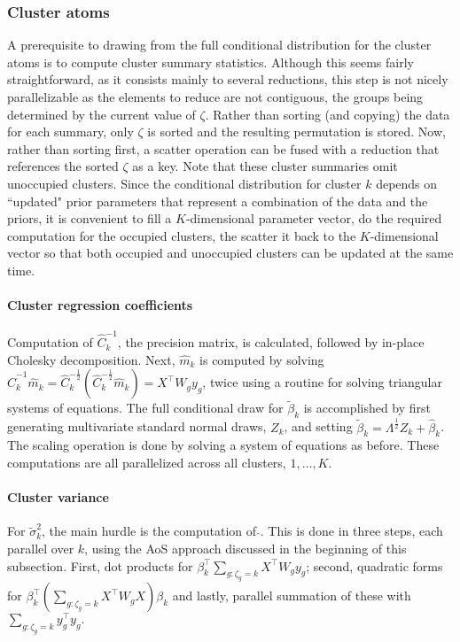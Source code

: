 \subsubsection{Cluster atoms}
A prerequisite to drawing from the full conditional distribution for the cluster atoms is to compute cluster summary statistics. Although this seems fairly straightforward, as it consists mainly to several reductions, this step is not nicely parallelizable as the elements to reduce are not contiguous, the groups being determined by the current value of $\zeta$. Rather than sorting (and copying) the data for each summary, only $\zeta$ is sorted and the resulting permutation is stored. Now, rather than sorting first, a scatter operation can be fused with a reduction that references the sorted $\zeta$ as a key. Note that these cluster summaries omit unoccupied clusters. Since the conditional distribution for cluster $k$ depends on ``updated" prior parameters that represent a combination of the data and the priors, it is convenient to fill a $K$-dimensional parameter vector, do the required computation for the occupied clusters, the scatter it back to the $K$-dimensional vector so that both occupied and unoccupied clusters can be updated at the same time.

\paragraph{Cluster regression coefficients}
Computation of
$\hat{C}_k^{-1}$, the precision matrix, is calculated, followed
by in-place Cholesky decomposition. Next, $\hat{m}_k$ is computed
by solving
$\hat{C}_k^{-1}\hat{m}_k=\hat{C}_k^{-\frac{1}{2}}\left(\hat{C}_k^{-\frac{1}{2}}\hat{m}_k\right)
= X^\top W_g y_g$, twice using a routine for solving triangular
systems of equations. The full conditional draw for $\tilde{\beta}_k$ is
accomplished by first generating multivariate standard normal draws, $Z_k$, and setting $\tilde{\beta}_k =
\Lambda^{\frac{1}{2}} Z_k + \hat{\beta}_k$. The scaling operation is
done by solving a system of equations as before. These
computations are all parallelized across all clusters, $1,\ldots,K$.

\paragraph{Cluster variance}
For $\tilde{\sigma}^2_k$, the main hurdle is the computation of
$\hat{}$. This is done in three steps, each parallel over $k$, using
the AoS approach discussed in the beginning of this subsection. First,
dot products for $\beta_k^\top \sum_{g:\zeta_g=k}X^\top W_g y_g$;
second, quadratic forms for $\beta_k^\top\left( \sum_{g:\zeta_g=k}
  X^\top W_g X \right) \beta_k$ and lastly, parallel summation of
these with $\sum_{g:\zeta_g=k}y_g^\top y_g.$

